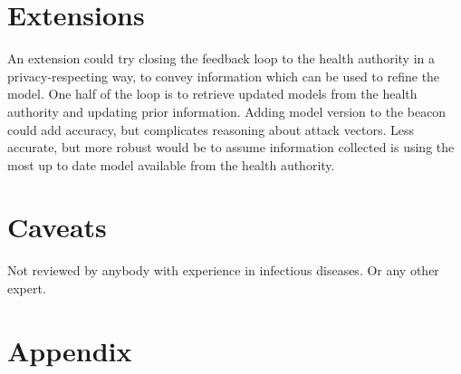 \documentclass{article}
\begin{document}
\section{Extensions}
An extension could try closing the feedback loop to the health authority in a
privacy-respecting way, to convey information which can be used to refine the
model. One half of the loop is to retrieve updated models from the health
authority and updating prior information. Adding model version
to the beacon could add accuracy, but complicates reasoning about
attack vectors. Less accurate, but more robust would be to assume information
collected is using the most up to date model
available from the health authority.

\section{Caveats}

Not reviewed by anybody with experience in infectious diseases. Or any other expert.

\section*{Appendix}


\end{document}
